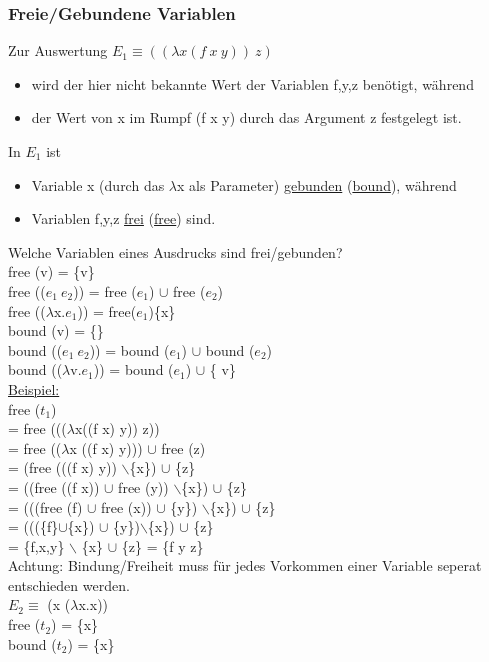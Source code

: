 \documentclass[a4paper,12pt]{article}
\begin{document}
\subsubsection{Freie/Gebundene Variablen}
Zur Auswertung $E_1\equiv((\lambda x(f \ x \ y))\ z)$\\
\begin{itemize}
\item wird der hier nicht bekannte Wert der Variablen f,y,z benötigt, während
\item der Wert von x im Rumpf (f x y) durch das Argument z festgelegt ist.
\end{itemize}
In $E_1$ ist
\begin{itemize}
\item Variable x (durch das $\lambda$x als Parameter) \uline{gebunden} (\uline{bound}), während
\item Variablen f,y,z \uline{frei} (\uline{free}) sind.
\end{itemize}
Welche Variablen eines Ausdrucks sind frei/gebunden?\\
free (v) = \{v\}\\
free (($e_1 \ e_2$)) = free ($e_1$) $\cup$ free ($e_2$)\\
free (($\lambda$x.$e_1$)) = free($e_1$)\text{\ }\{x\}\\
bound (v) = \{\}\\
bound (($e_1 \ e_2$)) = bound ($e_1$) $\cup$ bound ($e_2$)\\
bound (($\lambda$v.$e_1$)) = bound ($e_1$) $\cup$ \{ v\}\\
\uline{Beispiel:}\\
free ($t_1$)\\
= free ((($\lambda$x((f x) y)) z))\\
= free (($\lambda$x ((f x) y))) $\cup$ free (z)\\
= (free (((f x) y)) $\backslash$\{x\}) $\cup$ \{z\}\\
= ((free ((f x)) $\cup$ free (y)) $\backslash$\{x\}) $\cup$ \{z\}\\
= (((free (f) $\cup$ free (x)) $\cup$ \{y\}) $\backslash$\{x\}) $\cup$ \{z\}\\
= (((\{f\}$\cup$\{x\}) $\cup$ \{y\})$\backslash$\{x\}) $\cup$ \{z\}\\
= \{f,x,y\} $\backslash$ \{x\} $\cup$ \{z\} = \{f y z\}\\
Achtung: Bindung/Freiheit muss für jedes Vorkommen einer Variable seperat entschieden werden.\\ $E_2 \equiv$ (x ($\lambda$x.x))\\
free ($t_2$) = \{x\}\\
bound ($t_2$) = \{x\}\\
\\
\end{document}
